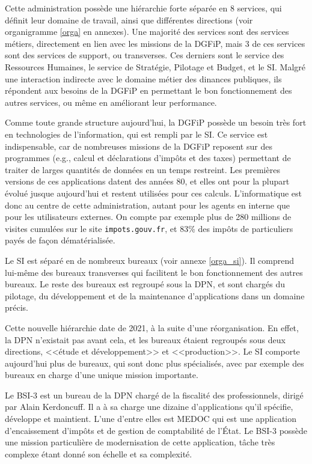 \documentclass[openany, 11pt]{memoir}
\begin{document}
Cette administration possède une hiérarchie forte séparée en 8 services, qui définit leur domaine de travail, ainsi que différentes directions (voir organigramme \ref{orga} en annexes). Une majorité des services sont des services métiers, directement en lien avec les missions de la \gls{DGFiP}, mais 3 de ces services sont des services de support, ou \glspl{transverse}. Ces derniers sont le service des Ressources Humaines, le service de Stratégie, Pilotage et Budget, et le \gls{SI}. Malgré une interaction indirecte avec le domaine métier des dinances publiques, ils répondent aux besoins de la DGFiP en permettant le bon fonctionnement des autres services, ou même en améliorant leur performance.

\bigskip
Comme toute grande structure aujourd'hui, la \gls{DGFiP} possède un besoin très fort en technologies de l'information, qui est rempli par le \gls{SI}. Ce service est indispensable, car de nombreuses missions de la DGFiP reposent sur des programmes (e.g., calcul et déclarations d'impôts et des taxes) permettant de traiter de larges quantités de données en un temps restreint. Les premières versions de ces applications datent des années 80, et elles ont pour la plupart évolué jusque aujourd'hui et restent utilisées pour ces calculs. L'informatique est donc au centre de cette administration, autant pour les agents en interne que pour les utilisateurs externes. On compte par exemple plus de 280 millions de visites cumulées sur le site \texttt{impots.gouv.fr}, et 83\% des impôts de particuliers payés de façon dématérialisée.

Le \gls{SI} est séparé en de nombreux bureaux (voir annexe \ref{orga_si}). Il comprend lui-même des bureaux \glspl{transverse} qui facilitent le bon fonctionnement des autres bureaux. Le reste des bureaux est regroupé sous la \gls{DPN}, et sont chargés du pilotage, du développement et de la maintenance d'applications dans un domaine précis.

Cette nouvelle hiérarchie date de 2021, à la suite d'une réorganisation. En effet, la \gls{DPN} n'existait pas avant cela, et les bureaux étaient regroupés sous deux directions, <<étude et développement>> et <<production>>. Le \gls{SI} comporte aujourd'hui plus de bureaux, qui sont donc plus spécialisés, avec par exemple des bureaux en charge d'une unique mission importante.

\bigskip
Le \gls{BSI-3} est un bureau de la \gls{DPN} chargé de la fiscalité des professionnels, dirigé par Alain Kerdoncuff. Il a à sa charge une dizaine d'applications qu'il spécifie, développe et maintient. L'une d'entre elles est \gls{MEDOC} qui est une application d'encaissement d'impôts et de gestion de comptabilité de l'État. Le \gls{BSI-3} possède une mission particulière de modernisation de cette application, tâche très complexe étant donné son échelle et sa complexité.
\end{document}
